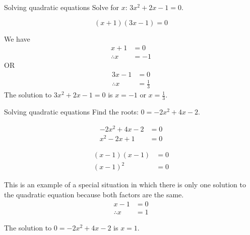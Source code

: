 
        
\begin{wex}
{Solving quadratic equations }
{Solve for $x$: $3{x}^{2}+2x-1=0$.}
{

\begin{equation*}
  (x+1)(3x-1)=0
\end{equation*}

We have
\begin{align*}
  x+1 &= 0 \\
  \therefore x &= -1
\end{align*}
OR
\begin{align*}
  3x-1 &= 0 \\
  \therefore x &= \frac{1}{3}
\end{align*}
The solution to $3{x}^{2}+2x-1=0$ is $x=-1$ or $x=\frac{1}{3}$.
}
\end{wex}
\clearpage

\begin{wex}{Solving quadratic equations}
{Find the roots:  $0=-2{x}^{2}+4x-2$.}
{
\begin{align*}
  -2{x}^{2}+4x-2 &= 0 \\
  {x}^{2}-2x+1 &= 0
\end{align*}


\begin{align*}
  (x-1)(x-1) &= 0 \\
  (x-1)^{2} &= 0
\end{align*}

This is an example of a special situation in which there is only one solution to the quadratic equation because both factors are the same.
\begin{align*}
  x -1 &=  0 \\
  \therefore x & = 1
\end{align*}

 
The solution to $0=-2{x}^{2}+4x-2$ is $x=1$.
}
\end{wex}


